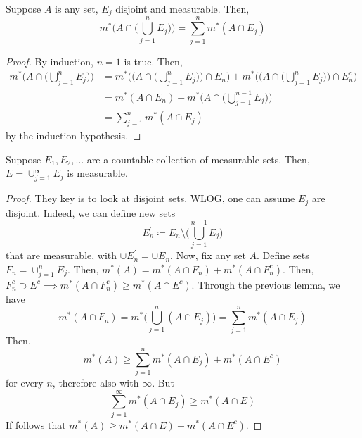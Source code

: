   \begin{lemma} 
    Suppose $A$ is any set, $E_j$ disjoint and measurable. Then, 
    \begin{equation}
      m^\ast \bigg( A \cap \Big( \bigcup_{j=1}^n E_j \Big) \bigg) = \sum_{j=1}^n m^\ast (A \cap E_j)
    \end{equation}
  \end{lemma}
  \begin{proof}
    By induction, $n = 1$ is true. Then, 
    \begin{align}
      m^\ast \bigg( A \cap \Big( \bigcup_{j=1}^n E_j \Big) \bigg) 
        & = m^\ast \Bigg( \bigg( A \cap \Big( \bigcup_{j=1}^n E_j \Big) \bigg) \cap E_n \Bigg) + m^\ast \Bigg( \bigg( A \cap \Big( \bigcup_{j=1}^n E_j \Big) \bigg) \cap E_n^c \Bigg) \\  
        & = m^\ast (A \cap E_n) + m^\ast \bigg( A \cap \Big( \bigcup_{j=1}^{n-1} E_j \Big) \bigg) \\ 
        & = \sum_{j=1}^n m^\ast (A \cap E_j)
    \end{align}
    by the induction hypothesis. 
  \end{proof}

  \begin{theorem}
    Suppose $E_1, E_2, \ldots$ are a countable collection of measurable sets. Then, $E = \cup_{j=1}^\infty E_j$ is measurable. 
  \end{theorem}
  \begin{proof}
    They key is to look at disjoint sets. WLOG, one can assume $E_j$ are disjoint. Indeed, we can define new sets 
    \begin{equation}
      E_n^\prime \coloneqq E_n \setminus \bigg( \bigcup_{j=1}^{n-1} E_j \bigg) 
    \end{equation}
    that are measurable, with $\cup E_n^\prime = \cup E_n$. Now, fix any set $A$. Define sets $F_n = \cup_{j=1}^n E_j$. Then, $m^\ast (A) = m^\ast (A \cap F_n) + m^\ast (A \cap F_n^c)$. Then, $F_n^c \supset E^c \implies m^\ast (A \cap F_n^c) \geq m^\ast (A \cap E^c)$. Through the previous lemma, we have 
    \begin{equation}
      m^\ast (A \cap F_n) = m^\ast \bigg( \bigcup_{j=1}^n (A \cap E_j) \bigg) = \sum_{j=1}^n m^\ast (A \cap E_j) 
    \end{equation}
    Then, 
    \begin{equation}
      m^\ast (A) \geq \sum_{j=1}^n m^\ast (A \cap E_j) + m^\ast (A \cap E^c) 
    \end{equation}
    for every $n$, therefore also with $\infty$. But 
    \begin{equation}
      \sum_{j=1}^\infty m^\ast (A \cap E_j) \geq m^\ast (A \cap E)
    \end{equation}
    If follows that $m^\ast (A) \geq m^\ast (A \cap E) + m^\ast (A \cap E^c)$. 
  \end{proof}

